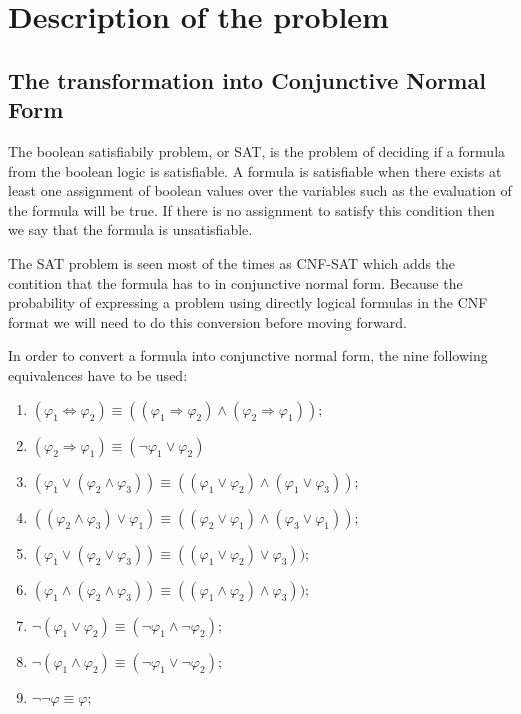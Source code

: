 \chapter{Description of the problem}

\section{The transformation into Conjunctive Normal Form}

The boolean satisfiabily problem, or SAT, is the problem of deciding if 
a formula from the boolean logic is satisfiable. A formula is satisfiable when
there exists at least one assignment of boolean values over the variables
such as the evaluation of the formula will be true. If there is no assignment
to satisfy this condition then we say that the formula is unsatisfiable.

The SAT problem is seen most of the times as CNF-SAT which adds the contition
that the formula has to in conjunctive normal form. Because the probability
of expressing a problem using directly logical formulas in the CNF format we 
will need to do this conversion before moving forward.

In order to convert a formula into conjunctive normal form, the nine following equivalences have to be used:

\begin{enumerate}
  \item $( \varphi_1 \Leftrightarrow \varphi_2) \equiv ((\varphi_1 \Rightarrow \varphi_2) \land (\varphi_2 \Rightarrow \varphi_1));$
  \item $(\varphi_2 \Rightarrow \varphi_1) \equiv (\neg \varphi_1 \lor \varphi_2)$
  \item $(\varphi_1 \lor (\varphi_2 \land \varphi_3)) \equiv ((\varphi_1 \lor \varphi_2) \land (\varphi_1 \lor \varphi_3));$
  \item $((\varphi_2 \land \varphi_3) \lor \varphi_1) \equiv ((\varphi_2 \lor \varphi_1) \land (\varphi_3 \lor \varphi_1));$
  \item $(\varphi_1 \lor (\varphi_2 \lor \varphi_3)) \equiv ((\varphi_1 \lor \varphi_2) \lor \varphi_3));$
  \item $(\varphi_1 \land (\varphi_2 \land \varphi_3)) \equiv ((\varphi_1 \land \varphi_2) \land \varphi_3));$
  \item $\neg (\varphi_1 \lor \varphi_2) \equiv (\neg \varphi_1 \land \neg \varphi_2);$
  \item $\neg (\varphi_1 \land \varphi_2) \equiv (\neg \varphi_1 \lor \neg \varphi_2);$
  \item $\neg \neg \varphi \equiv \varphi;$
\end{enumerate}

